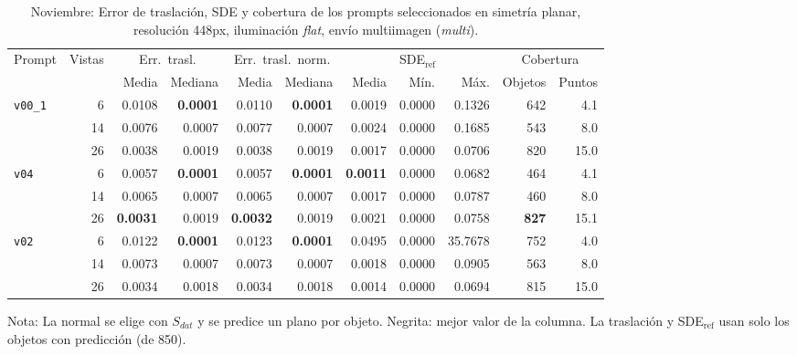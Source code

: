\begin{table}[htbp]
\centering
\caption{Noviembre: Error de traslación, SDE y cobertura de los prompts seleccionados en simetría planar, resolución 448px, iluminación \textit{flat}, envío multiimagen (\textit{multi}).}
\label{tab:nov_plane_448_posicion}
\begin{lrbox}{\tablebox}
\begin{adjustbox}{max width=\textwidth}
\begin{tabular}{lrrrrrrrrrr}
\toprule
\multirow{2}{*}{Prompt} & \multirow{2}{*}{Vistas} & \multicolumn{2}{c}{Err.\ trasl.} & \multicolumn{2}{c}{Err.\ trasl.\ norm.} & \multicolumn{3}{c}{SDE$_{\mathrm{ref}}$} & \multicolumn{2}{c}{Cobertura} \\
\cmidrule(lr){3-4} \cmidrule(lr){5-6} \cmidrule(lr){7-9} \cmidrule(lr){10-11}
 &  & Media & Mediana & Media & Mediana & Media & Mín. & Máx. & Objetos & Puntos \\
\midrule
\multirow{3}{*}{\texttt{v00\_1}} & 6 & 0.0108 & \textbf{0.0001} & 0.0110 & \textbf{0.0001} & 0.0019 & 0.0000 & 0.1326 & 642 & 4.1 \\
 & 14 & 0.0076 & 0.0007 & 0.0077 & 0.0007 & 0.0024 & 0.0000 & 0.1685 & 543 & 8.0 \\
 & 26 & 0.0038 & 0.0019 & 0.0038 & 0.0019 & 0.0017 & 0.0000 & 0.0706 & 820 & 15.0 \\
\midrule
\multirow{3}{*}{\texttt{v04}} & 6 & 0.0057 & \textbf{0.0001} & 0.0057 & \textbf{0.0001} & \textbf{0.0011} & 0.0000 & 0.0682 & 464 & 4.1 \\
 & 14 & 0.0065 & 0.0007 & 0.0065 & 0.0007 & 0.0017 & 0.0000 & 0.0787 & 460 & 8.0 \\
 & 26 & \textbf{0.0031} & 0.0019 & \textbf{0.0032} & 0.0019 & 0.0021 & 0.0000 & 0.0758 & \textbf{827} & 15.1 \\
\midrule
\multirow{3}{*}{\texttt{v02}} & 6 & 0.0122 & \textbf{0.0001} & 0.0123 & \textbf{0.0001} & 0.0495 & 0.0000 & 35.7678 & 752 & 4.0 \\
 & 14 & 0.0073 & 0.0007 & 0.0073 & 0.0007 & 0.0018 & 0.0000 & 0.0905 & 563 & 8.0 \\
 & 26 & 0.0034 & 0.0018 & 0.0034 & 0.0018 & 0.0014 & 0.0000 & 0.0694 & 815 & 15.0 \\
\bottomrule
\end{tabular}
\end{adjustbox}
\end{lrbox}
\usebox{\tablebox}

\vspace{1.5ex}
\begin{minipage}{\wd\tablebox}
\footnotesize
Nota: La normal se elige con $S_{dat}$ y se predice un plano por objeto. Negrita: mejor valor de la columna. La traslación y SDE$_{\mathrm{ref}}$ usan solo los objetos con predicción (de 850).
\end{minipage}
\end{table}

